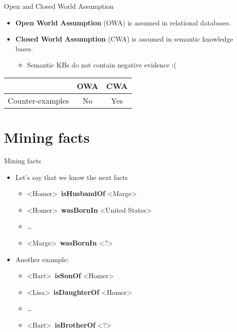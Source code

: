 \documentclass{beamer}
\begin{document}
\begin{frame}{Open and Closed World Assumption}

\begin{itemize}
    \item \textbf{Open World Assumption} (OWA) is assumed in relational databases.
    \item \textbf{Closed World Assumption} (CWA) is assumed in semantic knowledge bases.
        \begin{itemize}
            \item Semantic KBs do not contain negative evidence :(
        \end{itemize}
\end{itemize}

\begin{tabular}{ l | c | c }
    \toprule
    & OWA & CWA \\
    \midrule
    Counter-examples & No & Yes \\
    \bottomrule
\end{tabular}

\end{frame}

\section{Mining facts}
\begin{frame}{Mining facts}
\begin{itemize}
   \item Let’s say that we know the next facts
   \begin{itemize}
   		\item \textless Homer\textgreater\  \textbf{isHusbandOf} \textless Marge\textgreater\
        \item \textless Homer\textgreater\  \textbf{wasBornIn} \textless United States\textgreater\
        \item \ldots
        \item \textless Marge\textgreater\  \textbf{wasBornIn} \textless?\textgreater
   \end{itemize}
   \item Another example:
   \begin{itemize}
   		\item \textless Bart\textgreater\  \textbf{isSonOf} \textless Homer\textgreater
        \item \textless Lisa\textgreater\  \textbf{isDaughterOf} \textless Homer\textgreater
        \item \ldots
        \item \textless Bart\textgreater\  \textbf{isBrotherOf} \textless?\textgreater
   \end{itemize}
\end{itemize}
\end{frame}
\end{document}
